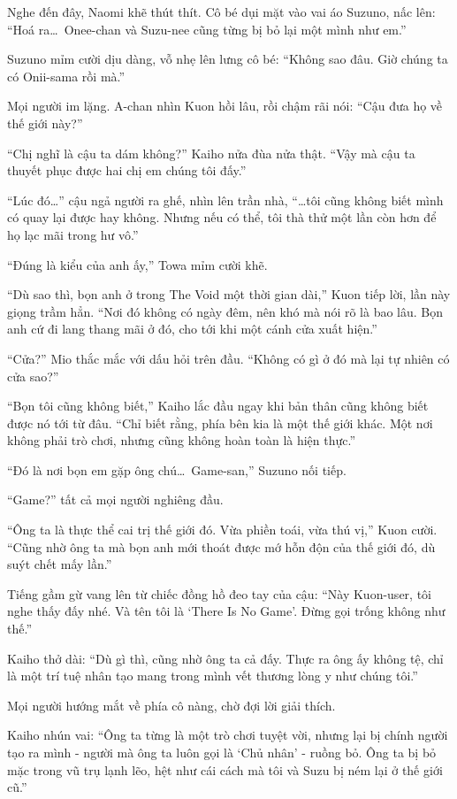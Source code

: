 \documentclass[../main.tex]{subfiles}
\begin{document}
Nghe đến đây, Naomi khẽ thút thít. Cô bé dụi mặt vào vai áo Suzuno, nấc lên: ``Hoá ra\dots\ Onee-chan và Suzu-nee cũng từng bị bỏ lại một mình như em.''

Suzuno mỉm cười dịu dàng, vỗ nhẹ lên lưng cô bé: ``Không sao đâu. Giờ chúng ta có Onii-sama rồi mà.''

Mọi người im lặng. A-chan nhìn Kuon hồi lâu, rồi chậm rãi nói: ``Cậu đưa họ về thế giới này?''

``Chị nghĩ là cậu ta dám không?'' Kaiho nửa đùa nửa thật. ``Vậy mà cậu ta thuyết phục được hai chị em chúng tôi đấy.''

``Lúc đó\dots'' cậu ngả người ra ghế, nhìn lên trần nhà, ``\dots tôi cũng không biết mình có quay lại được hay không. Nhưng nếu có thể, tôi thà thử một lần còn hơn để họ lạc mãi trong hư vô.''

``Đúng là kiểu của anh ấy,'' Towa mỉm cười khẽ.

``Dù sao thì, bọn anh ở trong The Void một thời gian dài,''  Kuon tiếp lời, lần này giọng trầm hẳn. ``Nơi đó không có ngày đêm, nên khó mà nói rõ là bao lâu. Bọn anh cứ đi lang thang mãi ở đó, cho tới khi một cánh cửa xuất hiện.''

``Cửa?'' Mio thắc mắc với dấu hỏi trên đầu. ``Không có gì ở đó mà lại tự nhiên có cửa sao?''

``Bọn tôi cũng không biết,'' Kaiho lắc đầu ngay khi bản thân cũng không biết được nó tới từ đâu. ``Chỉ biết rằng, phía bên kia là một thế giới khác. Một nơi không phải trò chơi, nhưng cũng không hoàn toàn là hiện thực.''

``Đó là nơi bọn em gặp ông chú\dots\ Game-san,'' Suzuno nối tiếp.

``Game?'' tất cả mọi người nghiêng đầu.

``Ông ta là thực thể cai trị thế giới đó. Vừa phiền toái, vừa thú vị,'' Kuon cười. ``Cũng nhờ ông ta mà bọn anh mới thoát được mớ hỗn độn của thế giới đó, dù suýt chết mấy lần.''

Tiếng gầm gừ vang lên từ chiếc đồng hồ đeo tay của cậu: ``Này Kuon-user, tôi nghe thấy đấy nhé. Và tên tôi là `There Is No Game'. Đừng gọi trống không như thế.''

Kaiho thở dài: ``Dù gì thì, cũng nhờ ông ta cả đấy. Thực ra ông ấy không tệ, chỉ là một trí tuệ nhân tạo mang trong mình vết thương lòng y như chúng tôi.''

Mọi người hướng mắt về phía cô nàng, chờ đợi lời giải thích.

Kaiho nhún vai: ``Ông ta từng là một trò chơi tuyệt vời, nhưng lại bị chính người tạo ra mình - người mà ông ta luôn gọi là `Chủ nhân' - ruồng bỏ. Ông ta bị bỏ mặc trong vũ trụ lạnh lẽo, hệt như cái cách mà tôi và Suzu bị ném lại ở thế giới cũ.''
\end{document}
